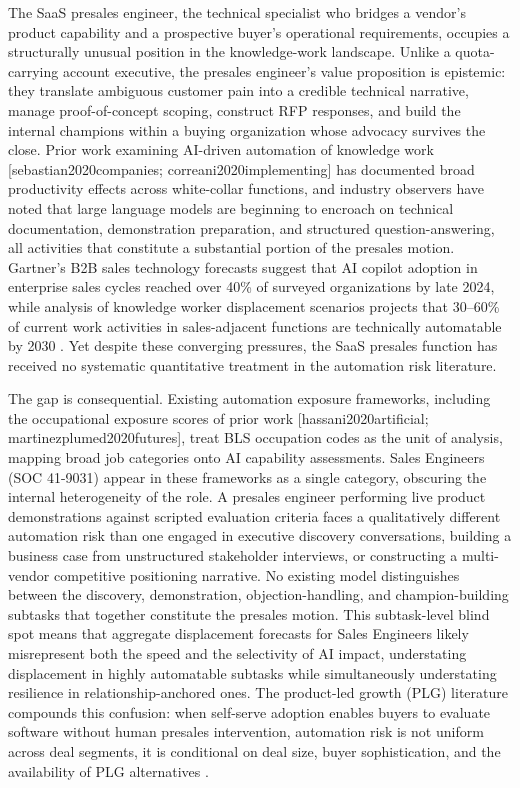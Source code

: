 \documentclass[10pt, conference]{IEEEtran}
\begin{document}
\label{sec:introduction}

The SaaS presales engineer, the technical specialist who bridges a vendor's product capability and a prospective buyer's operational requirements, occupies a structurally unusual position in the knowledge-work landscape. Unlike a quota-carrying account executive, the presales engineer's value proposition is epistemic: they translate ambiguous customer pain into a credible technical narrative, manage proof-of-concept scoping, construct RFP responses, and build the internal champions within a buying organization whose advocacy survives the close. Prior work examining AI-driven automation of knowledge work [sebastian2020companies; correani2020implementing] has documented broad productivity effects across white-collar functions, and industry observers have noted that large language models are beginning to encroach on technical documentation, demonstration preparation, and structured question-answering, all activities that constitute a substantial portion of the presales motion. Gartner's B2B sales technology forecasts suggest that AI copilot adoption in enterprise sales cycles reached over 40\% of surveyed organizations by late 2024, while analysis of knowledge worker displacement scenarios projects that 30--60\% of current work activities in sales-adjacent functions are technically automatable by 2030 \cite{johnk2020ready}. Yet despite these converging pressures, the SaaS presales function has received no systematic quantitative treatment in the automation risk literature.

The gap is consequential. Existing automation exposure frameworks, including the occupational exposure scores of prior work [hassani2020artificial; martinezplumed2020futures], treat BLS occupation codes as the unit of analysis, mapping broad job categories onto AI capability assessments. Sales Engineers (SOC 41-9031) appear in these frameworks as a single category, obscuring the internal heterogeneity of the role. A presales engineer performing live product demonstrations against scripted evaluation criteria faces a qualitatively different automation risk than one engaged in executive discovery conversations, building a business case from unstructured stakeholder interviews, or constructing a multi-vendor competitive positioning narrative. No existing model distinguishes between the discovery, demonstration, objection-handling, and champion-building subtasks that together constitute the presales motion. This subtask-level blind spot means that aggregate displacement forecasts for Sales Engineers likely misrepresent both the speed and the selectivity of AI impact, understating displacement in highly automatable subtasks while simultaneously understating resilience in relationship-anchored ones. The product-led growth (PLG) literature compounds this confusion: when self-serve adoption enables buyers to evaluate software without human presales intervention, automation risk is not uniform across deal segments, it is conditional on deal size, buyer sophistication, and the availability of PLG alternatives \cite{davis2021varieties}.
\end{document}
